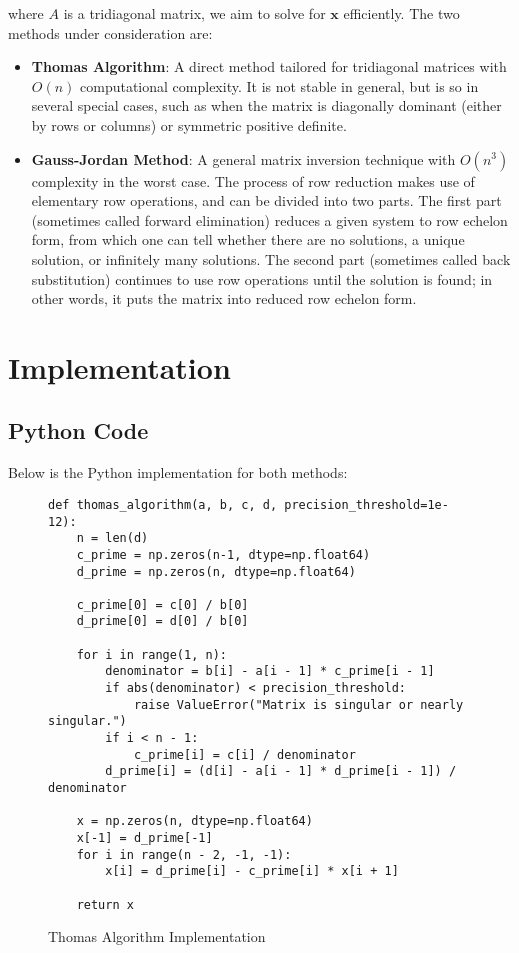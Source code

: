 \documentclass[a4paper,12pt]{article}
\begin{document}
where \(A\) is a tridiagonal matrix, we aim to solve for \(\mathbf{x}\) efficiently. The two methods under consideration are:
\begin{itemize}
    \item \textbf{Thomas Algorithm}: A direct method tailored for tridiagonal matrices with \(O(n)\) computational complexity. It is not stable in general, but is so in several special cases, such as when the matrix is diagonally dominant (either by rows or columns) or symmetric positive definite.
    \item \textbf{Gauss-Jordan Method}: A general matrix inversion technique with \(O(n^3)\) complexity in the worst case. The process of row reduction makes use of elementary row operations, and can be divided into two parts. The first part (sometimes called forward elimination) reduces a given system to row echelon form, from which one can tell whether there are no solutions, a unique solution, or infinitely many solutions. The second part (sometimes called back substitution) continues to use row operations until the solution is found; in other words, it puts the matrix into reduced row echelon form.
\end{itemize}

\newpage
\section*{Implementation}
\subsection*{Python Code}
Below is the Python implementation for both methods:

\begin{figure}[H]
\caption{Thomas Algorithm Implementation}
\begin{verbatim}
def thomas_algorithm(a, b, c, d, precision_threshold=1e-12):
    n = len(d)
    c_prime = np.zeros(n-1, dtype=np.float64)
    d_prime = np.zeros(n, dtype=np.float64)

    c_prime[0] = c[0] / b[0]
    d_prime[0] = d[0] / b[0]

    for i in range(1, n):
        denominator = b[i] - a[i - 1] * c_prime[i - 1]
        if abs(denominator) < precision_threshold:
            raise ValueError("Matrix is singular or nearly singular.")
        if i < n - 1:
            c_prime[i] = c[i] / denominator
        d_prime[i] = (d[i] - a[i - 1] * d_prime[i - 1]) / denominator

    x = np.zeros(n, dtype=np.float64)
    x[-1] = d_prime[-1]
    for i in range(n - 2, -1, -1):
        x[i] = d_prime[i] - c_prime[i] * x[i + 1]

    return x
\end{verbatim}
\end{figure}
\end{document}
